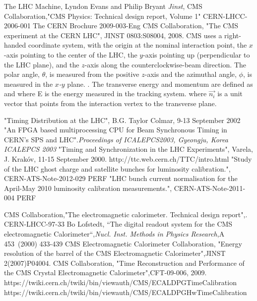 \begin{thebibliography}{9}
 The LHC Machine, Lyndon Evans and Philip Bryant \textit{Jinst},
CMS Collaboration,"CMS Physics: Technical design report, Volume 1" CERN-LHCC-2006-001
 The CERN Brochure 2009-003-Eng
CMS Collaboration, "The CMS experiment at the CERN LHC", JINST 0803:S08004, 2008.
CMS uses a right-handed coordinate system, with the origin at the nominal interaction point, the \emph{$x$}-axis pointing to the center of the LHC, 
the \emph{$y$}-axis pointing up (perpendicular to the LHC plane), and the \emph{$z$}-axis along the counterclockwise-beam direction. The polar angle, $\theta$, 
is measured from the positive \emph{$z$}-axis and the azimuthal angle, $\phi$, is measured in the \emph{$x$-$y$} plane. . 
The transverse energy and momentum are defined as  and  where \textsc{E} is the energy measured in the 
tracking system. where $\vec{n_{i}}$ is a unit vector that points from the interaction vertex to the transverse plane.

 "Timing Distribution at the LHC",  B.G. Taylor Colmar, 9-13 September 2002
 "An FPGA based multiprocessing CPU for Beam
Synchronous Timing in CERN’s SPS and LHC".\emph{Proceedings of ICALEPCS2003, Gyeongju, Korea
ICALEPCS 2003}
 "Timing and Synchronization in the LHC Experiments", Varela, J. Krakóv, 11-15 September 2000.
 http://ttc.web.cern.ch/TTC/intro.html
 "Study of the LHC ghost charge and
satellite bunches for luminosity calibration.", CERN-ATS-Note-2012-029 PERF
 "LHC bunch current normalisation for the April-May 2010 luminosity calibration measurements.", CERN-ATS-Note-2011-004 PERF

CMS Collaboration,"The electromagnetic calorimeter. Technical design report",. CERN-LHCC-97-33
 Bo Lofstedt, ``The digital readout system for the CMS electromagnetic Calorimeter``,\textit{Nucl. Inst.  Methods in Physics Research},A 453~(2000) 433-439
CMS Electromagnetic Calorimeter Collaboration, "Energy resolution of the barrel of the CMS Electromagnetic Calorimeter",JINST 2(2007)P04004.
CMS Collaboration, "Time Reconstruction and Performance of the CMS Crystal Electromagnetic Calorimeter",CFT-09-006, 2009.
 https://twiki.cern.ch/twiki/bin/viewauth/CMS/ECALDPGTimeCalibration
https://twiki.cern.ch/twiki/bin/viewauth/CMS/ECALDPGHwTimeCalibration


\end{thebibliography}
